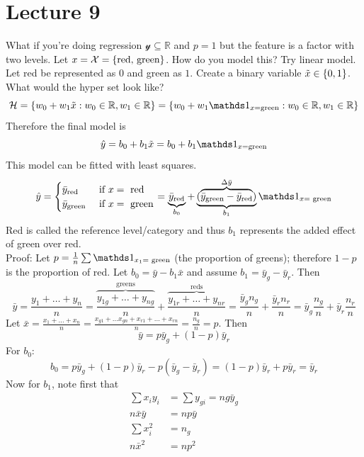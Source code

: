 \documentclass[12pt]{article}
\begin{document}
\section{Lecture 9} 
What if you're doing regression $\mathcal{y} \subseteq \mathbb{R}$ and $p = 1$ but the feature is a factor with two levels. Let $x = \mathcal{X} = \left\{ \text{red, green} \right\}$. How do you model this? Try linear model. \\
Let red be represented as $0$ and green as $1$. Create a binary variable $\tilde{x} \in \left\{ 0,1 \right\}$. What would the hyper set look like? 
$$ \mathcal{H} = \set{w_0 + w_1\tilde{x}: w_0 \in \mathbb{R}, w_1 \in \mathbb{R}} = \set{w_0 + w_1\indicator{x = \text{green}}: w_0 \in \mathbb{R}, w_1 \in \mathbb{R}} $$ 
Therefore the final model is $$\hat{y} = b_0 + b_1\tilde{x} = b_0 + b_1\indicator{x = \text{green}} $$ 
This model can be fitted with least squares. 
$$\hat{y} = \begin{cases} \bar{y}_{\text{red}} &\text{ if } x = \text{ red} \\ \bar{y}_{\text{green}} &\text{ if } x = \text{ green} \end{cases} = \underbrace{\bar{y}_{\text{red}}}_{b_0} + \underbrace{(\overbrace{\bar{y}_{\text{green}} - \bar{y}_{\text{red}}}^{\Delta \bar{y}})}_{b_1}\indicator{x = \text{ green}} $$ 
Red is called the reference level/category and thus $b_1$ represents the added effect of green over red. \\
Proof: Let $p = \frac{1}{n}\sum \indicator{x_1 = \text{ green}}$ (the proportion of greens); therefore $1-p$ is the proportion of red. Let $b_0 = \bar{y} - b_1\bar{x}$ and assume $b_1 = \bar{y}_g - \bar{y}_r$. Then 
$$\bar{y} = \frac{y_1 + \dots + y_n}{n} = \overbrace{\frac{y_{1g} + \dots + y_{ng}}{n}}^{\text{greens}} + \overbrace{\frac{y_{1r} + \dots + y_{nr}}{n}}^{\text{reds}} = \frac{\bar{y}_gn_g}{n} + \frac{\bar{y}_rn_r}{n} = \bar{y}_g\frac{n_g}{n} + \bar{y}_r\frac{n_r}{n}$$
Let $\bar{x} = \frac{x_1 + \dots + x_n}{n} = \frac{x_{g1} + \dots x_{gn} + x_{r1} + \dots + x_{rn}}{n} = \frac{n_g}{n} = p$. Then $$ \bar{y} = p\bar{y}_g + (1-p)\bar{y}_r $$ 
For $b_0$: 
$$ b_0 = p\bar{y}_g + (1-p)\bar{y}_r - p(\bar{y}_g - \bar{y}_r) = (1-p)\bar{y}_r + p\bar{y}_r = \bar{y}_r $$ 
Now for $b_1$, note first that
 $$ \begin{aligned} \sum x_iy_i &= \sum y_{gi} = ng\bar{y}_g \\ n\bar{x}\bar{y} &= np\bar{y} \\ \sum x_i^2 &= n_g \\ n\bar{x}^2 &= np^2 \end{aligned} $$ 
\end{document}
